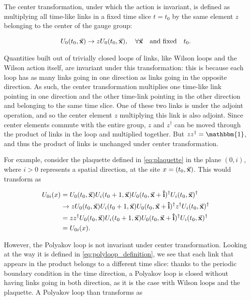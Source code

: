 \documentclass[reqno,12pt]{article}
\numberwithin{equation}{section}
\newcommand{\id}{\mathbbm{1}}
\begin{document}
The center transformation, under which the action is invariant, is defined as multiplying all time-like links in 
a fixed time slice $t = t_0$ by the same element $z$ belonging to the center of the gauge group:

\begin{equation}
	U_0(t_0, \va{x}) \rightarrow z U_0(t_0, \va{x}) \qc \forall \va{x} \qq{and fixed} t_0.
\end{equation}

Quantities built out of trivially closed loops of links, like Wilson loops and the Wilson action itself, are invariant under this 
transformation: this is because each loop has as many links going in one direction as links going in the opposite direction.
As such, the center transformation multiplies one time-like link pointing in one direction and the other time-link pointing
in the other direction and belonging to the same time slice. One of these two links is under the adjoint operation, and so
the center element $z$ multiplying this link is also adjoint. Since center elements commute with the entire group, $z$ and
$z^\dagger$ can be moved through the product of links in the loop and multiplied together. But $z z^\dagger = \id$, 
and thus the product of links is unchanged under center transformation.   

For example, consider the plaquette defined in \eqref{eq:plaquette} in the plane $(0, i)$, where $i > 0$ represents a spatial
direction, at the site $x = (t_0, \va{x})$. This would transform as

\begin{equation} \label{eq:center_trans}
	\begin{aligned}
	U_{0i}(x) &= U_0(t_0, \va{x}) U_i(t_0 + 1, \va{x}) U_0(t_0, \va{x} + \vu{i})^\dagger U_i(t_0, \va{x})^\dagger \\
	&\rightarrow z U_0(t_0, \va{x}) U_i(t_0 + 1, \va{x}) U_0(t_0, \va{x} + \vu{i})^\dagger z^\dagger U_i(t_0, \va{x})^\dagger \\
	&= z z^\dagger U_0(t_0, \va{x}) U_i(t_0 + 1, \va{x}) U_0(t_0, \va{x} + \vu{i})^\dagger U_i(t_0, \va{x})^\dagger \\
	&= U_{0i}(x).
	\end{aligned}
\end{equation}

However, the Polyakov loop is not invariant under center transformation. Looking at the way it is defined in
\eqref{eq:polyloop_definition}, we see that each link that appears in the product belongs to a different time slice: thanks
to the periodic boundary condition in the time direction, a Polyakov loop is closed without having links going in both direction,
as it is the case with Wilson loops and the plaquette. A Polyakov loop than transforms as
\end{document}
